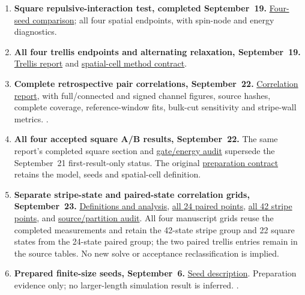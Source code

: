 \documentclass[11pt,letterpaper]{article}
\begin{document}
\begin{enumerate}
 \item\label{ev:positive-v}
 \textbf{Square repulsive-interaction test, completed September~19.}
 \href{run:../reports/square_positive_v_20260918/README.md}{Four-seed comparison};
 all four spatial endpoints, with spin-node and energy diagnostics.

 \item\label{ev:trellis}
 \textbf{All four trellis endpoints and alternating relaxation, September~19.}
 \href{run:../reports/trellis_progress_20260918/README.md}{Trellis report} and
 \href{run:../TRELLIS_MEAN_FIELD.md}{spatial-cell method contract}.

 \item\label{ev:pair-correlations}
 \textbf{Complete retrospective pair correlations, September~22.}
 \href{run:../reports/pair_correlations_20260922/correlation_report.pdf}{Correlation report},
 with full/connected and signed channel figures, source hashes, complete
 coverage, reference-window fits, bulk-cut sensitivity and stripe-wall metrics.
 .

 \item\label{ev:square-ab-complete}
 \textbf{All four accepted square A/B results, September~22.}
 The same report's completed square section and
 \href{run:../reports/pair_correlations_20260922/square_AB_results.json}{gate/energy audit}
 supersede the September~21 first-result-only status.
 The original \href{run:../reports/square_two_ladder_20260920/README.md}{preparation contract}
 retains the model, seeds and spatial-cell definition.

 \item\label{ev:paired-stripe-correlations}
 \textbf{Separate stripe-state and paired-state correlation grids, September~23.}
 \href{run:../reports/stripe_pairing_grid_20260923/README.md}{Definitions and analysis},
 \href{run:../reports/stripe_pairing_grid_20260923/paired_points.csv}{all 24 paired points},
 \href{run:../reports/stripe_pairing_grid_20260923/stripe_points.csv}{all 42 stripe points},
 and \href{run:../reports/stripe_pairing_grid_20260923/validation.json}{source/partition audit}.
 All four manuscript grids reuse the completed measurements and retain
 the 42-state stripe group and 22 square states from the 24-state paired
 group; the two paired trellis entries remain in the source tables. No new solve or
 acceptance reclassification is implied.

 \item\label{ev:length}
 \textbf{Prepared finite-size seeds, September~6.}
 \href{run:../reports/finite_size_seeds_20260906/README.md}{Seed description}.
 Preparation evidence only; no larger-length simulation result is inferred.
 .
\end{enumerate}
\end{document}
